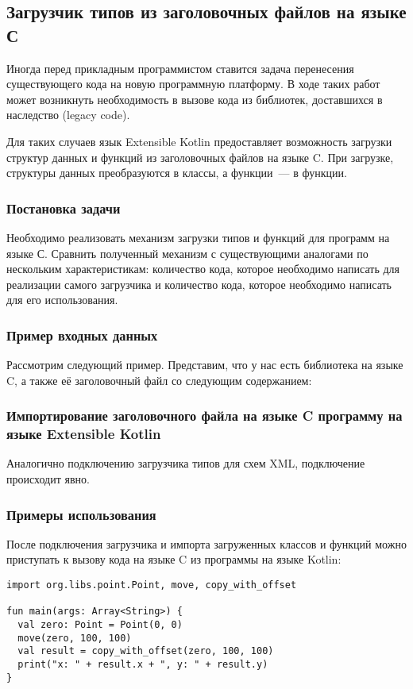 \subsection{Загрузчик типов из заголовочных файлов на языке С}\label{c-loader}
Иногда перед прикладным программистом ставится задача перенесения существующего кода на новую программную платформу.
В ходе таких работ может возникнуть необходимость в вызове кода из библиотек, доставшихся в наследство (legacy code).

Для таких случаев язык Extensible Kotlin предоставляет возможность загрузки структур данных и функций из заголовочных файлов на языке C.
При загрузке, структуры данных преобразуются в классы, а функции~--- в функции.

\subsubsection{Постановка задачи}
\td Необходимо реализовать механизм загрузки типов и функций для программ на языке С. Сравнить полученный механизм с существующими аналогами по нескольким характеристикам: количество кода, которое необходимо написать для реализации самого загрузчика и количество кода, которое необходимо написать для его использования.

\subsubsection{Пример входных данных}
Рассмотрим следующий пример. Представим, что у нас есть библиотека на языке C, а также её заголовочный файл со следующим содержанием:


\subsubsection{Импортирование заголовочного файла на языке C программу на языке Extensible Kotlin}
Аналогично подключению загрузчика типов для схем XML, подключение происходит явно. \td

\subsubsection{Примеры использования}
После подключения загрузчика и импорта загруженных классов и функций можно приступать к вызову кода на языке C из программы на языке Kotlin:
\begin{lstlisting}
import org.libs.point.Point, move, copy_with_offset

fun main(args: Array<String>) {
  val zero: Point = Point(0, 0)
  move(zero, 100, 100)
  val result = copy_with_offset(zero, 100, 100)
  print("x: " + result.x + ", y: " + result.y)
}
\end{lstlisting}
